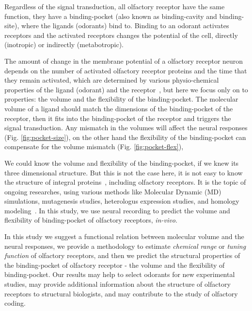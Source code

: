 \documentclass[11pt]{paper} %
\begin{document}
Regardless of the signal transduction, 
all olfactory receptor have the same function, they have a binding-pocket (also known as binding-cavity and binding-site),
where the ligands (odorants) bind to. 
Binding to an odorant activates receptors and 
the activated receptors changes the potential of the cell, 
directly (inotropic) or indirectly (metabotropic).

The amount of change in the membrane potential of a olfactory receptor neuron depends on the number of activated olfactory receptor proteins and the time that they remain activated,
which are determined by various physio-chemical properties of the ligand (odorant) and the receptor~\cite{Turin,Araneda2000,Gabler2013}, 
but here we focus only on to properties: the volume and the flexibility of the binding-pocket.
The molecular volume of a ligand should match the dimensions of the binding-pocket of the receptor,
then it fits into the binding-pocket of the receptor and triggers the signal transduction. 
Any mismatch in the volumes will affect the neural responses (Fig. \ref{fig:pocket-size}), 
on the other hand the flexibility of the binding-pocket can compensate for the volume mismatch (Fig. \ref{fig:pocket-flex}),

We could know the volume and flexibility of the binding-pocket, 
if we knew its three dimensional structure.
But this is not the case here, 
it is not easy to know the structure of integral proteins~\cite{Zhang2008,Lupieri2009}, 
including olfactory receptors. 
It is the topic of ongoing researches, 
using various methods like Molecular Dynamic (MD) simulations, 
mutagenesis studies, heterologus expression studies, and homology modeling~\cite{Khafizov2007,Man2004,Lai2005,Vaidehi2002,Floriano2004,Schmiedeberg2007,Katada2005,Kato2008,Rospars2013}.
In this study, we use neural recording to predict the volume and flexibility of binding-pocket of olfactory receptors, {\it in-vivo}.

In this study we suggest a functional relation between molecular volume and the neural responses, 
we provide a methodology to estimate {\it chemical range} or {\it tuning function} of olfactory receptors,
and then we predict the structural properties of the binding-pocket of olfactory receptor - the volume and the flexibility of binding-pocket.
Our results may help to select odorants  for new experimental studies, 
may provide additional information about the structure of olfactory receptors to structural biologists, 
and may contribute to the study of olfactory coding.
\end{document}
